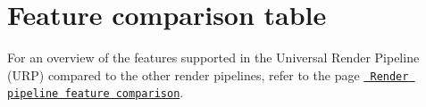 \chapter{Feature comparison table}
\hypertarget{md__hey_tea_9_2_library_2_package_cache_2com_8unity_8render-pipelines_8universal_0d14_80_88_2_do566121d210c227129ff1dc8f20e0ca08}{}\label{md__hey_tea_9_2_library_2_package_cache_2com_8unity_8render-pipelines_8universal_0d14_80_88_2_do566121d210c227129ff1dc8f20e0ca08}
\label{md__hey_tea_9_2_library_2_package_cache_2com_8unity_8render-pipelines_8universal_0d14_80_88_2_do566121d210c227129ff1dc8f20e0ca08_autotoc_md2533}%
%
 For an overview of the features supported in the Universal Render Pipeline (URP) compared to the other  render pipelines, refer to the page \href{https://docs.unity3d.com/2022.2/Documentation/Manual/render-pipelines-feature-comparison.html}{\texttt{ Render pipeline feature comparison}}. 